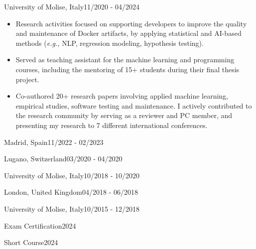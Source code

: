    {University of Molise, Italy}{11/2020 - 04/2024}
   \begin{itemize}
      \item Research activities focused on supporting developers to improve the quality and maintenance of Docker artifacts, by applying statistical and AI-based methods (\textit{e.g.,} NLP, regression modeling, hypothesis testing).
      \item Served as teaching assistant for the machine learning and programming courses, including the mentoring of 15+ students during their final thesis project.
      \item Co-authored 20+ research papers involving applied machine learning, empirical studies, software testing and maintenance. I actively contributed to the research community by serving as a reviewer and PC member, and presenting my research to 7 different international conferences.
   \end{itemize}

   {Madrid, Spain}{11/2022 - 02/2023}

   {Lugano, Switzerland}{03/2020 - 04/2020}

   {University of Molise, Italy}{10/2018 - 10/2020}

   {London, United Kingdom}{04/2018 - 06/2018}

   {University of Molise, Italy}{10/2015 - 12/2018}

   {Exam Certification}{2024}
   
   {Short Course}{2024}